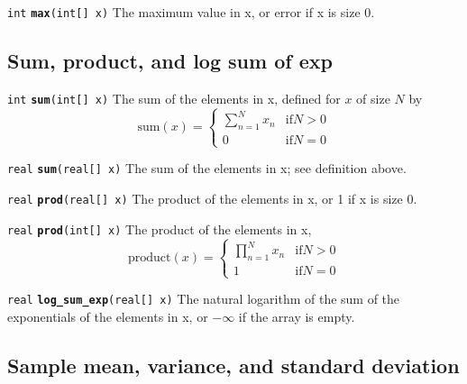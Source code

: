\documentclass[
  10pt,
]{book}
\begin{document}
\texttt{int} \textbf{\texttt{max}}\texttt{(int{[}{]}\ x)}\newline
The maximum value in x, or error if x is size 0.

\hypertarget{sum-product-and-log-sum-of-exp}{%
\subsection{Sum, product, and log sum of exp}\label{sum-product-and-log-sum-of-exp}}


\texttt{int} \textbf{\texttt{sum}}\texttt{(int{[}{]}\ x)}\newline
The sum of the elements in x, defined for \(x\) of size \(N\) by \[
\text{sum}(x) = \begin{cases} \sum_{n=1}^N x_n & \text{if} N > 0
\\[4pt] 0 & \text{if} N = 0 \end{cases} \]


\texttt{real} \textbf{\texttt{sum}}\texttt{(real{[}{]}\ x)}\newline
The sum of the elements in x; see definition above.


\texttt{real} \textbf{\texttt{prod}}\texttt{(real{[}{]}\ x)}\newline
The product of the elements in x, or 1 if x is size 0.


\texttt{real} \textbf{\texttt{prod}}\texttt{(int{[}{]}\ x)}\newline
The product of the elements in x, \[ \text{product}(x) = \begin{cases}
\prod_{n=1}^N x_n & \text{if} N > 0 \\[4pt] 1 & \text{if} N = 0
\end{cases} \]


\texttt{real} \textbf{\texttt{log\_sum\_exp}}\texttt{(real{[}{]}\ x)}\newline
The natural logarithm of the sum of the exponentials of the elements
in x, or \(-\infty\) if the array is empty.

\hypertarget{sample-mean-variance-and-standard-deviation}{%
\subsection{Sample mean, variance, and standard deviation}\label{sample-mean-variance-and-standard-deviation}}
\end{document}
